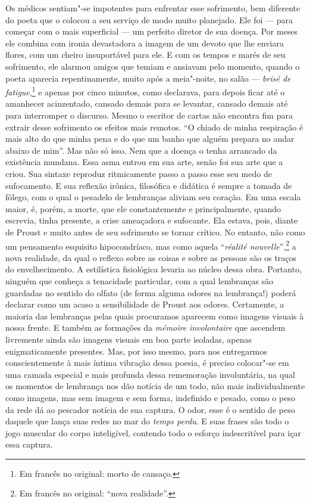 Os médicos sentiam"-se impotentes para enfrentar esse sofrimento, bem
diferente do poeta que o colocou a seu serviço de modo muito planejado.
Ele foi --- para começar com o mais superficial --- um perfeito diretor de
sua doença. Por meses ele combina com ironia devastadora a imagem de um
devoto que lhe enviara flores, com um cheiro insuportável para ele. E
com os tempos e marés de seu sofrimento, ele alarmou amigos que temiam e
ansiavam pelo momento, quando o poeta aparecia repentinamente, muito
após a meia"-noite, no salão --- \emph{brisé de fatigue},\footnote{Em francês no original:
  morto de cansaço. \versal{[N.~T.]}} e apenas por cinco minutos, como declarava, para
depois ficar até o amanhecer acinzentado, cansado demais para se
levantar, cansado demais até para interromper o discurso. Mesmo o
escritor de cartas não encontra fim para extrair desse sofrimento os
efeitos mais remotos. ``O chiado de minha respiração é mais alto do que
minha pena e do que um banho que alguém prepara no andar abaixo de
mim''. Mas não só isso. Nem que a doença o tenha arrancado da existência
mundana. Essa asma entrou em sua arte, senão foi sua arte que a criou.
Sua sintaxe reproduz ritmicamente passo a passo esse seu medo de
sufocamento. E sua reflexão irônica, filosófica e didática é sempre a
tomada de fôlego, com o qual o pesadelo de lembranças aliviam seu
coração. Em uma escala maior, é, porém, a morte, que ele constantemente
e principalmente, quando escrevia, tinha presente, a crise ameaçadora e
sufocante. Ela estava, pois, diante de Proust e muito antes de seu
sofrimento se tornar crítico. No entanto, não como um pensamento
esquisito hipocondríaco, mas como aquela ``\emph{réalité nouvelle}'',\footnote{Em francês no original: ``nova realidade''. \versal{[N.~T.]}} a nova realidade,
da qual o reflexo sobre as coisas e sobre as pessoas são os traços do
envelhecimento. A estilística fisiológica levaria ao núcleo dessa obra.
Portanto, ninguém que conheça a tenacidade particular, com a qual
lembranças são guardadas no sentido do olfato (de forma alguma odores na
lembrança!) poderá declarar como um acaso a sensibilidade de Proust aos
odores. Certamente, a maioria das lembranças pelas quais procuramos
aparecem como imagens visuais à nossa frente. E também as formações da
\emph{mémoire} \emph{involontaire} que ascendem livremente ainda são
imagens visuais em boa parte isoladas, apenas enigmaticamente presentes.
Mas, por isso mesmo, para nos entregarmos conscientemente à mais íntima
vibração dessa poesia, é preciso colocar"-se em uma camada especial e
mais profunda dessa rememoração involuntária, na qual os momentos de
lembrança nos dão notícia de um todo, não mais individualmente como
imagens, mas sem imagem e sem forma, indefinido e pesado, como o peso da
rede dá ao pescador notícia de sua captura. O odor, esse é o sentido de
peso daquele que lança suas redes no mar do \emph{temps perdu}. E suas
frases são todo o jogo muscular do corpo inteligível, contendo todo o
esforço indescritível para içar essa captura.

